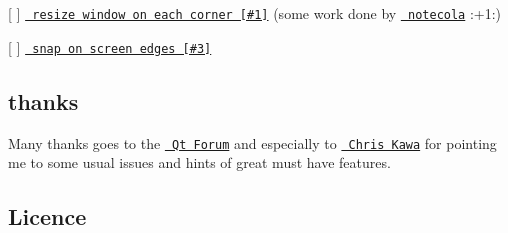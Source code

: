 \begin{DoxyItemize}
\item \mbox{[} \mbox{]} \href{https://github.com/Jorgen-VikingGod/Qt-Frameless-Window-DarkStyle/issues/1}{\texttt{ resize window on each corner \mbox{[}\#1\mbox{]}}} (some work done by \href{https://github.com/notecola}{\texttt{ notecola}} \+:+1\+:)
\item \mbox{[} \mbox{]} \href{https://github.com/Jorgen-VikingGod/Qt-Frameless-Window-DarkStyle/issues/3}{\texttt{ snap on screen edges \mbox{[}\#3\mbox{]}}}
\end{DoxyItemize}

\subsection*{thanks}

Many thanks goes to the \href{https://forum.qt.io/topic/80654/how-to-create-vs2013-like-frameless-window-with-dark-style}{\texttt{ Qt Forum}} and especially to \href{https://forum.qt.io/user/chris-kawa}{\texttt{ Chris Kawa}} for pointing me to some usual issues and hints of great must have features.

\subsection*{Licence}

